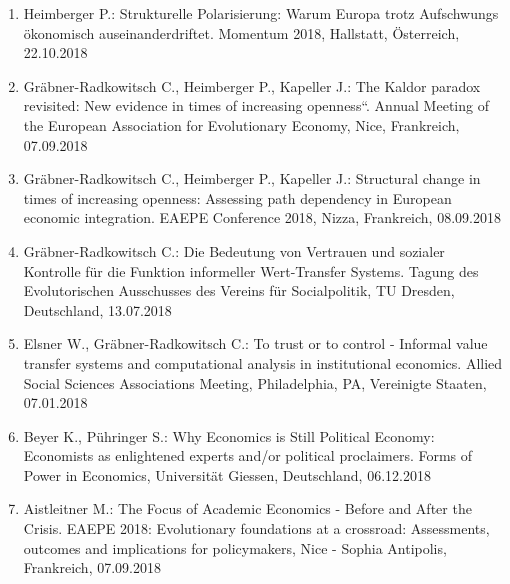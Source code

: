 \begin{enumerate}
	\item Heimberger P.: Strukturelle Polarisierung: Warum Europa trotz Aufschwungs ökonomisch auseinanderdriftet. Momentum 2018, Hallstatt, Österreich, 22.10.2018
	\item Gräbner-Radkowitsch C., Heimberger P., Kapeller J.: The Kaldor paradox revisited: New evidence in times of increasing openness“. Annual Meeting of the European Association for Evolutionary Economy, Nice, Frankreich, 07.09.2018
	\item Gräbner-Radkowitsch C., Heimberger P., Kapeller J.: Structural change in times of increasing openness: Assessing path dependency in European economic integration. EAEPE Conference 2018, Nizza, Frankreich, 08.09.2018
	\item Gräbner-Radkowitsch C.: Die Bedeutung von Vertrauen und sozialer Kontrolle für die Funktion informeller Wert-Transfer Systems. Tagung des Evolutorischen Ausschusses des Vereins für Socialpolitik, TU Dresden, Deutschland, 13.07.2018
	\item Elsner W., Gräbner-Radkowitsch C.: To trust or to control - Informal value transfer systems and computational analysis in institutional economics. Allied Social Sciences Associations Meeting, Philadelphia, PA, Vereinigte Staaten, 07.01.2018
	\item Beyer K., Pühringer S.: Why Economics is Still Political Economy: Economists as enlightened experts and/or political proclaimers. Forms of Power in Economics, Universität Giessen, Deutschland, 06.12.2018
	\item Aistleitner M.: The Focus of Academic Economics - Before and After the Crisis. EAEPE 2018: Evolutionary foundations at a crossroad: Assessments, outcomes and implications for policymakers, Nice - Sophia Antipolis, Frankreich, 07.09.2018
\end{enumerate}

